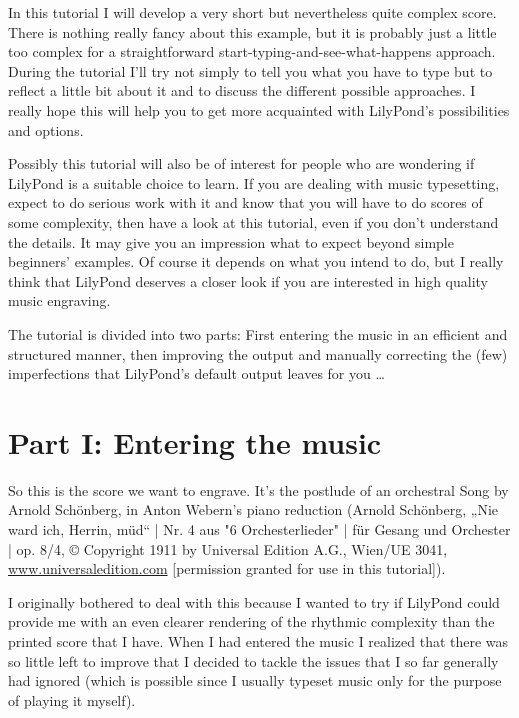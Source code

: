 \documentclass[../LilyPond-Tutorials]{subfiles}
\begin{document}
In this tutorial I will develop a very short but nevertheless quite complex score. 
There is nothing really fancy about this example, but it is probably just a little too complex for a straightforward start-typing-and-see-what-happens approach. 
During the tutorial I'll try not simply to tell you what you have to type but to reflect a little bit about it and to discuss the different possible approaches. 
I really hope this will help you to get more acquainted with LilyPond's possibilities and options.

Possibly this tutorial will also be of interest for people who are wondering if LilyPond is a suitable choice to learn. 
If you are dealing with music typesetting, expect to do serious work with it and know that you will have to do scores of some complexity, then have a look at this tutorial, even if you don't understand the details. 
It may give you an impression what to expect beyond simple beginners' examples. 
Of course it depends on what you intend to do, but I really think that LilyPond deserves a closer look if you are interested in high quality music engraving.

The tutorial is divided into two parts: First entering the music in an efficient and structured manner, then improving the output and manually correcting the (few) imperfections that LilyPond's default output leaves for you \dots

\section{Part I: Entering the music}

So this is the score we want to engrave. 
It's the postlude of an orchestral Song by Arnold Schönberg, in Anton Webern's piano reduction (Arnold Schönberg, „Nie ward ich, Herrin, müd“ | Nr. 4 aus "6 Orchesterlieder" | für Gesang und Orchester | op. 8/4, © Copyright 1911 by Universal Edition A.G., Wien/UE 3041, \url{www.universaledition.com} [permission granted for use in this tutorial]). 


I originally bothered to deal with this because I wanted to try if LilyPond could provide me with an even clearer rendering of the rhythmic complexity than the printed score that I have. 
When I had entered the music I realized that there was so little left to improve that I decided to tackle the issues that I so far generally had ignored (which is possible since I usually typeset music only for the purpose of playing it myself).
\end{document}
